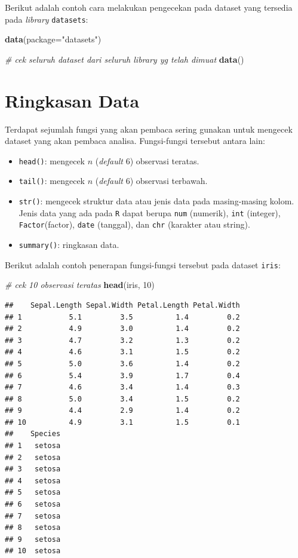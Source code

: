 \documentclass[
]{book}
\newenvironment{Shaded}{\begin{snugshade}}{\end{snugshade}}
\newcommand{\AttributeTok}[1]{\textcolor[rgb]{0.13,0.29,0.53}{#1}}
\newcommand{\CommentTok}[1]{\textcolor[rgb]{0.56,0.35,0.01}{\textit{#1}}}
\newcommand{\DecValTok}[1]{\textcolor[rgb]{0.00,0.00,0.81}{#1}}
\newcommand{\FunctionTok}[1]{\textcolor[rgb]{0.13,0.29,0.53}{\textbf{#1}}}
\newcommand{\NormalTok}[1]{#1}
\newcommand{\StringTok}[1]{\textcolor[rgb]{0.31,0.60,0.02}{#1}}
\providecommand{\tightlist}{%
  \setlength{\itemsep}{0pt}\setlength{\parskip}{0pt}}
\theoremstyle{definition}
\theoremstyle{definition}
\theoremstyle{definition}
\theoremstyle{definition}
\theoremstyle{remark}
\begin{document}
Berikut adalah contoh cara melakukan pengecekan pada dataset yang tersedia pada \emph{library} \texttt{datasets}:

\begin{Shaded}
\begin{Highlighting}[]
\FunctionTok{data}\NormalTok{(}\AttributeTok{package=}\StringTok{"datasets"}\NormalTok{)}

\CommentTok{\# cek seluruh dataset dari seluruh library yg telah dimuat}
\FunctionTok{data}\NormalTok{()}
\end{Highlighting}
\end{Shaded}

\hypertarget{summarystats}{%
\section{Ringkasan Data}\label{summarystats}}

Terdapat sejumlah fungsi yang akan pembaca sering gunakan untuk mengecek dataset yang akan pembaca analisa. Fungsi-fungsi tersebut antara lain:

\begin{itemize}
\tightlist
\item
  \texttt{head()}: mengecek \(n\) (\emph{default} 6) observasi teratas.
\item
  \texttt{tail()}: mengecek \(n\) (\emph{default} 6) observasi terbawah.
\item
  \texttt{str()}: mengecek struktur data atau jenis data pada masing-masing kolom. Jenis data yang ada pada \texttt{R} dapat berupa \texttt{num} (numerik), \texttt{int} (integer), \texttt{Factor}(factor), \texttt{date} (tanggal), dan \texttt{chr} (karakter atau string).
\item
  \texttt{summary()}: ringkasan data.
\end{itemize}

Berikut adalah contoh penerapan fungsi-fungsi tersebut pada dataset \texttt{iris}:

\begin{Shaded}
\begin{Highlighting}[]
\CommentTok{\# cek 10 observasi teratas}
\FunctionTok{head}\NormalTok{(iris, }\DecValTok{10}\NormalTok{)}
\end{Highlighting}
\end{Shaded}

\begin{verbatim}
##    Sepal.Length Sepal.Width Petal.Length Petal.Width
## 1           5.1         3.5          1.4         0.2
## 2           4.9         3.0          1.4         0.2
## 3           4.7         3.2          1.3         0.2
## 4           4.6         3.1          1.5         0.2
## 5           5.0         3.6          1.4         0.2
## 6           5.4         3.9          1.7         0.4
## 7           4.6         3.4          1.4         0.3
## 8           5.0         3.4          1.5         0.2
## 9           4.4         2.9          1.4         0.2
## 10          4.9         3.1          1.5         0.1
##    Species
## 1   setosa
## 2   setosa
## 3   setosa
## 4   setosa
## 5   setosa
## 6   setosa
## 7   setosa
## 8   setosa
## 9   setosa
## 10  setosa
\end{verbatim}
\end{document}
